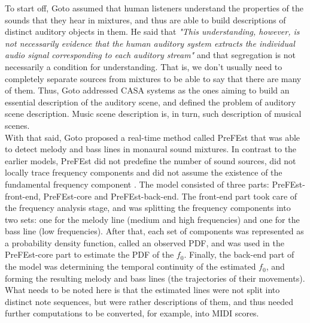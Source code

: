 To start off, Goto assumed that human listeners understand the properties of the sounds that they hear in mixtures, and thus are able to build descriptions of distinct auditory objects in them. He said that \textit{"This understanding, however, is not necessarily evidence that the human auditory system extracts the individual audio signal corresponding to each auditory stream"} \cite{Goto2004} and that segregation is not necessarily a condition for understanding. That is, we don't usually need to completely separate sources from mixtures to be able to say that there are many of them. Thus, Goto addressed CASA systems as the ones aiming to build an essential description of the auditory scene, and defined the problem of auditory scene description. Music scene description is, in turn, such description of musical scenes.\\

With that said, Goto proposed a real-time method called PreFEst that was able to detect melody and bass lines in monaural sound mixtures. In contrast to the earlier models, PreFEst did not predefine the number of sound sources, did not locally trace frequency components and did not assume the existence of the fundamental frequency component \cite{Goto2004}\cite{Wang2006}. The model consisted of three parts: PreFEst-front-end, PreFEst-core and PreFEst-back-end. The front-end part took care of the frequency analysis stage, and was splitting the frequency components into two sets: one for the melody line (medium and high frequencies) and one for the bass line (low frequencies). After that, each set of components was represented as a probability density function, called an observed PDF, and was used in the PreFEst-core part to estimate the PDF of the $f_0$. Finally, the back-end part of the model was determining the temporal continuity of the estimated $f_0$, and forming the resulting melody and bass lines (the trajectories of their movements). What needs to be noted here is that the estimated lines were not split into distinct note sequences, but were rather descriptions of them, and thus needed further computations to be converted, for example, into MIDI scores.\\

